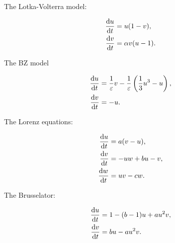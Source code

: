 The Lotka-Volterra model:

\begin{equation}
  \begin{split}
    \dv{u}{t}&=u(1-v),\\
    \dv{v}{t}&=\alpha v(u-1).\\    
    \end{split}
  \label{eq:LV}
\end{equation}

The BZ model

\begin{equation}
  \begin{split}
    \dv{u}{t}&=\dfrac{1}{\varepsilon}v-\dfrac{1}{\varepsilon}\left(\dfrac{1}{3}u^3-u\right),\\
    \dv{v}{t}&=-u.\\    
    \end{split}
  \label{eq:BZ}
\end{equation}

The Lorenz equations:

\begin{equation}
  \begin{split}
    \dv{u}{t}&=a(v-u),\\
    \dv{v}{t}&=-uw+bu-v,\\
    \dv{w}{t}&=uv-cw.
    \end{split}
  \label{eq:Lorenz}
\end{equation}

The Brusselator:

\begin{equation}
  \begin{split}
    \dv{u}{t}&=1-(b-1)u+au^2 v,\\
    \dv{v}{t}&=bu-au^2 v.\\
    \end{split}
  \label{eq:Lorenz}
\end{equation}

